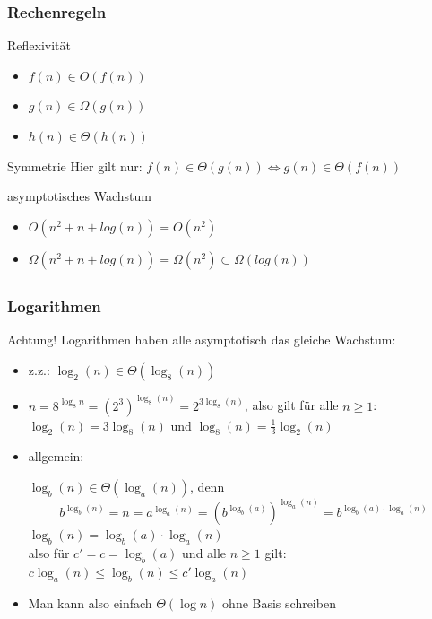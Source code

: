 \begin{frame}
			\frametitle{Rechenregeln}
			\begin{block}{Reflexivität}
                \begin{itemize}
                    \item $f(n) \in O(f(n))$
                    \item $g(n) \in \Omega(g(n))$
					\item $h(n) \in \Theta(h(n))$
                \end{itemize}
			\end{block}
			\begin{block}{Symmetrie}
					Hier gilt nur:  $f(n) \in \Theta(g(n)) \Leftrightarrow g(n) \in \Theta(f(n))$
			\end{block}
			\begin{block}{asymptotisches Wachstum}
				\begin{itemize}
                    \item $O(n^2 + n + log(n)) = O(n^2)$
                    \item $\Omega(n^2 + n + log(n)) = \Omega(n^2) \subset \Omega(log(n))$
                \end{itemize}
			\end{block}
\end{frame}

\subsection*{}
\begin{frame}
  \frametitle{Logarithmen}
    \begin{block}{Achtung!}
  		Logarithmen haben alle asymptotisch das gleiche Wachstum: \pause
  \begin{itemize}
  	\item z.z.: $\log_2(n) \in\Theta(\log_8(n))$ \pause
	\item $n = 8^{\log_8 n} = (2^3)^{\log_8(n)} = 2^{3\log_8(n)}$,
		also gilt für alle $n\geq 1$: $\log_2(n) = 3 \log_8(n)$ und $\log_8(n)=\frac{1}{3}\log_2(n)$
	\item allgemein: \pause

 	 $\log_b(n) \in\Theta(\log_a(n))$, denn
	    \[
	    b^{\log_b(n)} = n = a^{\log_a(n)} = (b^{\log_b(a)})^{\log_a(n)} = b^{\log_b(a) \cdot \log_a(n) }
	    \]  \pause
	     $\log_b(n) = \log_b(a) \cdot \log_a(n)$ \\
	    also für $c'=c=\log_b(a)$ und alle $n\geq 1$ gilt: $c \log_a(n) \leq\log_b(n) \leq c' \log_a(n) $ \pause
	 \item Man kann also einfach $\Theta(\log n)$ ohne Basis schreiben
  \end{itemize}
  \end{block}
\end{frame}

